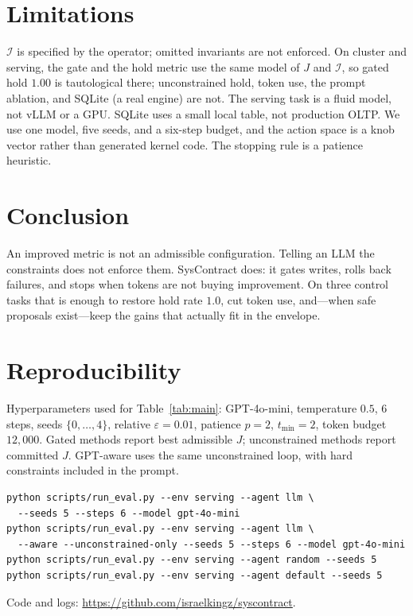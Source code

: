 \documentclass{article}
\begin{document}
\section{Limitations}

$\mathcal{I}$ is specified by the operator; omitted invariants are not enforced.
On cluster and serving, the gate and the hold metric use the same model of $J$ and $\mathcal{I}$, so gated hold $1.00$ is tautological there; unconstrained hold, token use, the prompt ablation, and SQLite (a real engine) are not.
The serving task is a fluid model, not vLLM or a GPU.
SQLite uses a small local table, not production OLTP.
We use one model, five seeds, and a six-step budget, and the action space is a knob vector rather than generated kernel code.
The stopping rule is a patience heuristic.

\section{Conclusion}

An improved metric is not an admissible configuration.
Telling an LLM the constraints does not enforce them.
SysContract does: it gates writes, rolls back failures, and stops when tokens are not buying improvement.
On three control tasks that is enough to restore hold rate $1.0$, cut token use, and---when safe proposals exist---keep the gains that actually fit in the envelope.




\appendix
\section{Reproducibility}

Hyperparameters used for Table~\ref{tab:main}: GPT-4o-mini, temperature $0.5$, $6$ steps, seeds $\{0,\ldots,4\}$,
relative $\varepsilon=0.01$, patience $p=2$, $t_{\min}=2$, token budget $12{,}000$.
Gated methods report best admissible $J$; unconstrained methods report committed $J$.
GPT-aware uses the same unconstrained loop, with hard constraints included in the prompt.

\begin{verbatim}
python scripts/run_eval.py --env serving --agent llm \
  --seeds 5 --steps 6 --model gpt-4o-mini
python scripts/run_eval.py --env serving --agent llm \
  --aware --unconstrained-only --seeds 5 --steps 6 --model gpt-4o-mini
python scripts/run_eval.py --env serving --agent random --seeds 5
python scripts/run_eval.py --env serving --agent default --seeds 5
\end{verbatim}
Code and logs: \url{https://github.com/israelkingz/syscontract}.
\end{document}
